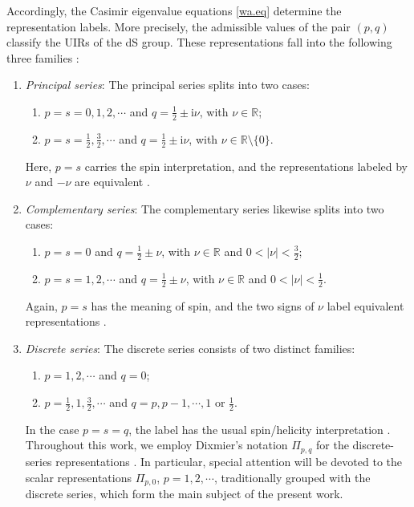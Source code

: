 \documentclass[aps,twocolumn,nofootinbib]{revtex4}
\begin{document}
Accordingly, the Casimir eigenvalue equations \eqref{wa.eq} determine the representation labels. More precisely, the admissible values of the pair $(p,q)$ classify the UIRs of the dS group. These representations fall into the following three families \cite{Gazeau2022, GazPejTod2026, Thomas, Newton, Takahashi, Dixmier, Martin1974}:
\begin{enumerate}
    \item{\emph{Principal series}: The principal series splits into two cases:
    \begin{enumerate}
        \item{$p=s=0,1,2,\cdots$ and $q=\frac{1}{2}\pm \mathrm{i}\nu$, with $\nu\in{\mathbb{R}}$;}
        
        \item{$p=s=\frac{1}{2},\frac{3}{2},\cdots$ and $q=\frac{1}{2}\pm \mathrm{i}\nu$, with $\nu\in{\mathbb{R}}\setminus\{0\}$.}
    \end{enumerate}
    Here, $p=s$ carries the spin interpretation, and the representations labeled by $\nu$ and $-\nu$ are equivalent \cite{Gazeau2022}.}

    \item{\emph{Complementary series}: The complementary series likewise splits into two cases:
    \begin{enumerate}
        \item{$p=s=0$ and $q=\frac{1}{2}\pm\nu$, with $\nu\in{\mathbb{R}}$ and $0<|\nu|<\frac{3}{2}$;}
        
        \item{$p=s=1,2,\cdots$ and $q=\frac{1}{2}\pm\nu$, with $\nu\in{\mathbb{R}}$ and $0<|\nu|<\frac{1}{2}$.}
    \end{enumerate}
    Again, $p=s$ has the meaning of spin, and the two signs of $\nu$ label equivalent representations \cite{Gazeau2022}.}

    \item{\emph{Discrete series}: The discrete series consists of two distinct families:
    \begin{enumerate}
        \item{$p=1,2,\cdots$ and $q=0$;}
        
        \item{$p=\frac{1}{2},1,\frac{3}{2},\cdots$ and $q=p,p-1,\cdots,1$ or $\frac{1}{2}$.}
    \end{enumerate}
    In the case $p=s=q$, the label has the usual spin/helicity interpretation \cite{GazPejTod2026}. Throughout this work, we employ Dixmier's notation $\Pi_{p,q}$ for the discrete-series representations \cite{Dixmier}. In particular, special attention will be devoted to the scalar representations $\Pi_{p,0}$, $p=1,2,\cdots$, traditionally grouped with the discrete series, which form the main subject of the present work.}
\end{enumerate}
\end{document}
